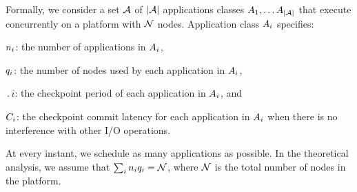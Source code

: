 Formally, we consider a set ${\mathcal A}$ of $|{\mathcal A}|$ applications classes
$A_{1}, \ldots A_{|{\mathcal A}|}$ that execute concurrently on a platform with
${\mathcal N}$ nodes. Application class $A_{i}$ specifies:
\begin{compactitem}
\item $n_{i}$: the number of applications in $A_{i}$,
\item $q_{i}$: the number of nodes used by each application in $A_{i}$,
\item $\period{i}$: the checkpoint period of each application in $A_{i}$, and
\item $C_{i}$: the checkpoint commit latency for each application in $A_{i}$
  when there is no interference with other I/O operations.
\end{compactitem}
%
%
At every instant, we schedule as many applications as possible.
In the theoretical analysis, we assume that
$\sum_{i}n_{i} q_{i} = {\mathcal N}$, where ${\mathcal N}$ is the total
number of nodes in the platform.


